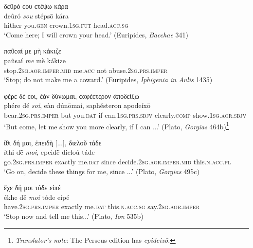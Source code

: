 \begin{exe}
\ex δεῦρό ϲου ϲτέψω κάρα\\
\gll deûró \emph{sou} stépsō kára\\
hither you.\textsc{gen} crown.\textsc{1sg.fut} head.\textsc{acc.sg}\\
\trans `Come here; I will crown your head.' (Euripides, \textit{Bacchae} 341)
\label{imper1}
\end{exe}

\begin{exe}
\ex παῦϲαί με μὴ κάκιζε\\
\gll paûsaí \emph{me} mḕ kákize\\
stop.\textsc{2sg.aor.imper.mid} me.\textsc{acc} not abuse.\textsc{2sg.prs.imper}\\
\trans `Stop; do not make me a coward.' (Euripides, \textit{Iphigenia in Aulis} 1435)
\label{imper2}
\end{exe}

\begin{exe}
\ex φέρε δέ ϲοι, ἐὰν δύνωμαι, ϲαφέϲτερον ἀποδείξω\\
\gll phére dé \emph{soi}, eàn dúnōmai, saphésteron apodeíxō\\
bear.\textsc{2sg.prs.imper} but you.\textsc{dat} if can.\textsc{1sg.prs.sbjv} clearly.\textsc{comp} show.\textsc{1sg.aor.sbjv}\\
\trans `But come, let me show you more clearly, if I can ...' (Plato, \textit{Gorgias} 464b)\footnote{\emph{Translator's note}: The Perseus edition has \textit{epideíxō}.}
\label{imper3}
\end{exe}

\begin{exe}
\ex ἴθι δή μοι, ἐπειδὴ {[}...{]}, διελοῦ τάδε\\
\gll íthi dḗ \emph{moi}, epeidḕ dieloû táde\\
go.\textsc{2sg.prs.imper} exactly me.\textsc{dat} since decide.\textsc{2sg.aor.imper.mid} this.\textsc{n.acc.pl}\\
\trans `Go on, decide these things for me, since ...' (Plato,
\textit{Gorgias} 495c)
\label{imper4}
\end{exe}

\begin{exe}
\ex ἔχε δή μοι τόδε εἰπέ\\
\gll ékhe dḗ \emph{moi} tóde eipé\\
have.\textsc{2sg.prs.imper} exactly me.\textsc{dat} this.\textsc{n.acc.sg} say.\textsc{2sg.aor.imper}\\
\trans `Stop now and tell me this...' (Plato, \textit{Ion} 535b)
\label{imper5}
\end{exe}

